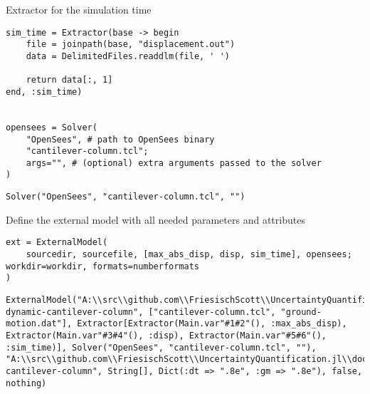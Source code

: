 Extractor for the simulation time




\begin{verbatim}
sim_time = Extractor(base -> begin
    file = joinpath(base, "displacement.out")
    data = DelimitedFiles.readdlm(file, ' ')

    return data[:, 1]
end, :sim_time)


opensees = Solver(
    "OpenSees", # path to OpenSees binary
    "cantilever-column.tcl";
    args="", # (optional) extra arguments passed to the solver
)
\end{verbatim}


\begin{verbatim}
Solver("OpenSees", "cantilever-column.tcl", "")
\end{verbatim}



Define the external model with all needed parameters and attributes




\begin{verbatim}
ext = ExternalModel(
    sourcedir, sourcefile, [max_abs_disp, disp, sim_time], opensees; workdir=workdir, formats=numberformats
)
\end{verbatim}


\begin{verbatim}
ExternalModel("A:\\src\\github.com\\FriesischScott\\UncertaintyQuantification.jl\\docs\\build\\examples\\demo/models/opensees-dynamic-cantilever-column", ["cantilever-column.tcl", "ground-motion.dat"], Extractor[Extractor(Main.var"#1#2"(), :max_abs_disp), Extractor(Main.var"#3#4"(), :disp), Extractor(Main.var"#5#6"(), :sim_time)], Solver("OpenSees", "cantilever-column.tcl", ""), "A:\\src\\github.com\\FriesischScott\\UncertaintyQuantification.jl\\docs\\build\\examples\\workdir-cantilever-column", String[], Dict(:dt => ".8e", :gm => ".8e"), false, nothing)
\end{verbatim}



